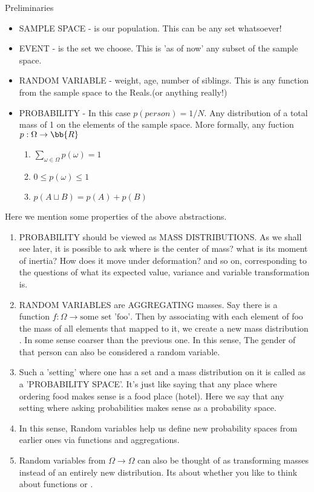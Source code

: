 \documentclass{myclass}
\begin{document}
\begin{redthm}{Preliminaries}
    \begin{itemize}
        \item SAMPLE SPACE - is our population. This can be any set whatsoever!
        \item EVENT - is the set we choose. This is 'as of now' any subset of the sample space.
        \item RANDOM VARIABLE - weight, age, number of siblings. This is any function from the sample space to the Reals.(or anything really!)
        \item PROBABILITY - In this case $p(person)=1/N$. Any distribution of a total mass of 1 on the elements of the sample space. More formally, any fuction $p:\Omega\to \bb{R}$\begin{enumerate}
            \item $\sum_{\omega\in \Omega}p(\omega)=1$
            \item $0\leq p(\omega)\leq 1$
            \item $p(A\sqcup B)=p(A)+p(B)$
        \end{enumerate}
    \end{itemize}
\end{redthm}
\begin{remarks}
    Here we mention some properties of the above abstractions.
    \begin{enumerate}
        \item PROBABILITY should be viewed as MASS DISTRIBUTIONS. As we shall see later, it is possible to ask where is the center of mass? what is its moment of inertia? How does it move under deformation? and so on, corresponding to the questions of what its 
               expected value, variance and variable transformation is. 
        \item RANDOM VARIABLES are AGGREGATING masses. Say there is a function $f:\Omega\to\text{some set 'foo'}$. Then by associating with each element of foo
                the mass of all elements that mapped to it, we create a new mass distribution . In some sense coarser than the previous one. In this sense, The gender of that person can also be considered a random variable.
        \item Such a 'setting' where one has a set and a mass distribution on it is called as a 'PROBABILITY SPACE'. It's just like saying that any place where ordering food makes sense is a food place (hotel). Here we say that any setting where asking probabilities makes sense as a probability space.
        \item In this sense, Random variables help us define new probability spaces from earlier ones via functions and aggregations.
        \item Random variables from $\Omega\to \Omega$ can also be thought of as transforming masses instead of an entirely new distribution. Its about whether you like to think about functions  or .
    \end{enumerate}
\end{remarks}
\end{document}
